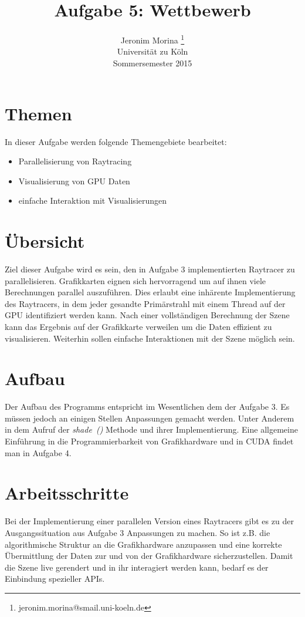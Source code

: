 \documentclass[10pt]{article}
\title{Aufgabe 5: Wettbewerb}
\author{Jeronim Morina \thanks{jeronim.morina@smail.uni-koeln.de}\\
        \scriptsize Universität zu Köln\\
        Sommersemester 2015
}
\begin{document}
\maketitle

\begin{multicols}{2}

\section{Themen}
In dieser Aufgabe werden folgende Themengebiete bearbeitet:
\begin{itemize}
    \item Parallelisierung von Raytracing
    \item Visualisierung von GPU Daten
    \item einfache Interaktion mit Visualisierungen
\end{itemize}


\section{Übersicht}

Ziel dieser Aufgabe wird es sein, den in Aufgabe 3 implementierten Raytracer zu parallelisieren. Grafikkarten eignen sich hervorragend um auf ihnen viele Berechnungen parallel auszuführen. Dies erlaubt eine inhärente Implementierung des Raytracers, in dem jeder gesandte Primärstrahl mit einem Thread auf der GPU identifiziert werden kann. Nach einer vollständigen Berechnung der Szene kann das Ergebnis auf der Grafikkarte verweilen um die Daten effizient zu visualisieren. Weiterhin sollen einfache Interaktionen mit der Szene möglich sein. 

\section{Aufbau} 

Der Aufbau des Programms entspricht im Wesentlichen dem der Aufgabe 3. Es müssen jedoch an einigen Stellen Anpassungen gemacht werden. Unter Anderem in dem Aufruf der \textit{shade~()} Methode und ihrer Implementierung. Eine allgemeine Einführung in die Programmierbarkeit von Grafikhardware und in CUDA findet man in Aufgabe 4. 


\section{Arbeitsschritte}
Bei der Implementierung einer parallelen Version eines Raytracers gibt es zu der Ausgangssituation aus Aufgabe 3 Anpassungen zu machen. So ist z.B. die algorithmische Struktur an die Grafikhardware anzupassen und eine korrekte Übermittlung der Daten zur und von der Grafikhardware sicherzustellen. Damit die Szene live gerendert und in ihr interagiert werden kann, bedarf es der Einbindung spezieller APIs.


\end{multicols}
\end{document}

